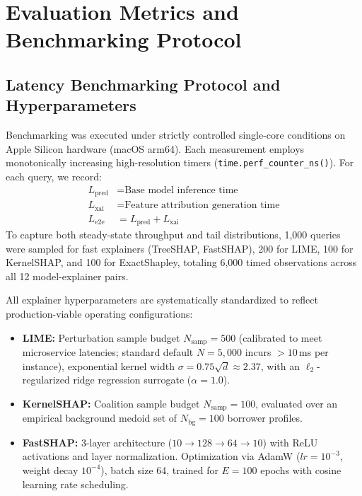 \documentclass[conference]{IEEEtran}
\begin{document}
\section{Evaluation Metrics and Benchmarking Protocol}
\subsection{Latency Benchmarking Protocol and Hyperparameters}
Benchmarking was executed under strictly controlled single-core conditions on Apple Silicon hardware (macOS arm64). Each measurement employs monotonically increasing high-resolution timers (\texttt{time.perf\_counter\_ns()}).
For each query, we record:
\begin{align}
    L_{\text{pred}} &= \text{Base model inference time} \\
    L_{\text{xai}} &= \text{Feature attribution generation time} \\
    L_{\text{e2e}} &= L_{\text{pred}} + L_{\text{xai}}
\end{align}
To capture both steady-state throughput and tail distributions, 1,000 queries were sampled for fast explainers (TreeSHAP, FastSHAP), 200 for LIME, 100 for KernelSHAP, and 100 for ExactShapley, totaling 6,000 timed observations across all 12 model-explainer pairs.

All explainer hyperparameters are systematically standardized to reflect production-viable operating configurations:
\begin{itemize}
    \item \textbf{LIME:} Perturbation sample budget $N_{\text{samp}} = 500$ (calibrated to meet microservice latencies; standard default $N=5,000$ incurs $>10$\,ms per instance), exponential kernel width $\sigma = 0.75\sqrt{d} \approx 2.37$, with an $\ell_2$-regularized ridge regression surrogate ($\alpha = 1.0$).
    \item \textbf{KernelSHAP:} Coalition sample budget $N_{\text{samp}} = 100$, evaluated over an empirical background medoid set of $N_{\text{bg}} = 100$ borrower profiles.
    \item \textbf{FastSHAP:} 3-layer architecture ($10 \to 128 \to 64 \to 10$) with ReLU activations and layer normalization. Optimization via AdamW ($lr=10^{-3}$, weight decay $10^{-4}$), batch size 64, trained for $E = 100$ epochs with cosine learning rate scheduling.
\end{itemize}
\end{document}
